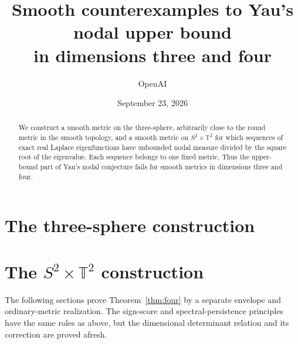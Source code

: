\documentclass[11pt]{article}
\title{Smooth counterexamples to Yau's nodal upper bound\\in dimensions three and four}
\author{OpenAI}
\date{September 23, 2026}
\numberwithin{equation}{section}
\theoremstyle{definition}
\theoremstyle{remark}
\newcommand{\T}{\mathbb T}
\begin{document}
\maketitle
\begin{abstract}
We construct a smooth metric on the three-sphere, arbitrarily close to the round metric in the smooth topology, and a smooth metric on $S^2\times\T^2$ for which sequences of exact real Laplace eigenfunctions have unbounded nodal measure divided by the square root of the eigenvalue. Each sequence belongs to one fixed metric. Thus the upper-bound part of Yau's nodal conjecture fails for smooth metrics in dimensions three and four.
\end{abstract}

\part*{The three-sphere construction}




\part*{The $S^2\times\T^2$ construction}
The following sections prove Theorem~\ref{thm:four} by a separate envelope and ordinary-metric realization. The sign-score and spectral-persistence principles have the same roles as above, but the dimensional determinant relation and its correction are proved afresh.






\end{document}
